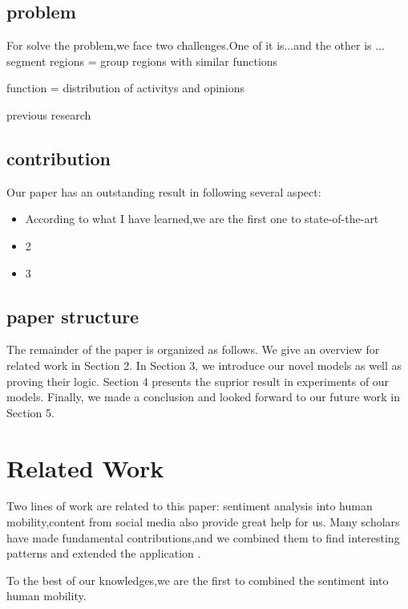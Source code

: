 \documentclass[runningheads]{llncs}
\begin{document}
\subsection{problem}
For solve the problem,we face two challenges.One of it is...and the other is ...
segment regions = group regions with similar functions

function = distribution of activitys and opinions


previous research









\subsection{contribution}
Our paper has an outstanding result in following several aspect:
\begin{itemize}
  \item According to what I have learned,we are the first one to state-of-the-art
  \item 2
  \item 3
\end{itemize}



\subsection{paper structure}
The remainder of the paper is organized as follows. 
We give an overview for related work in Section 2.
In Section 3, we introduce our novel models as well as proving their logic.
Section 4 presents the suprior result in experiments of our models.
Finally, we made a conclusion and looked forward to our future work in Section 5.

\section{Related Work}

Two lines of work are related to this paper: sentiment analysis into human mobility,content from social media also provide great help for us. Many scholars have made fundamental contributions,and we combined them to find interesting patterns and extended the application .

To the best of our knowledges,we are the first to combined the sentiment into human mobility.
\end{document}
